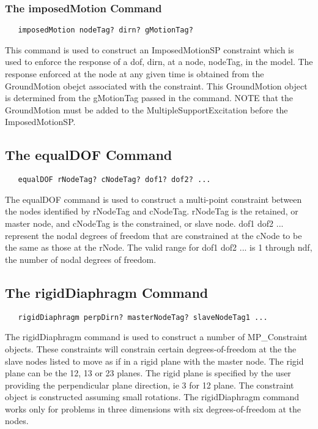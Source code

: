 \documentclass[12pt]{article}
\begin{document}
\subsubsection{The imposedMotion Command}
{\sf\small
\begin{verbatim}
   imposedMotion nodeTag? dirn? gMotionTag? 
\end{verbatim}
}

This command is used to construct an ImposedMotionSP constraint which
is used to enforce the response of a dof, dirn, at a node, nodeTag, in
the model. The response enforced at the node at any given time is
obtained from the GroundMotion obejct associated with the
constraint. This GroundMotion object is determined from the gMotionTag
passed in the command. NOTE that the GroundMotion must be added to the
MultipleSupportExcitation before the ImposedMotionSP. 


\subsection{The equalDOF Command}
{\sf\small
\begin{verbatim}
   equalDOF rNodeTag? cNodeTag? dof1? dof2? ...
\end{verbatim}
}

The equalDOF command is used to construct a multi-point constraint between
the nodes identified by rNodeTag and cNodeTag. rNodeTag is the retained, or
master node, and cNodeTag is the constrained, or slave node. dof1 dof2 ... 
represent the nodal degrees of freedom that are constrained at the cNode to
be the same as those at the rNode. The valid range for dof1 dof2 ... is 1
through ndf, the number of nodal degrees of freedom.

\subsection{The rigidDiaphragm Command}
{\sf\small
\begin{verbatim}
   rigidDiaphragm perpDirn? masterNodeTag? slaveNodeTag1 ...
\end{verbatim}
}

The rigidDiaphragm command is used to construct a number of
MP\_Constraint objects. These constraints will constrain certain
degrees-of-freedom at the the slave nodes listed to move as if in a
rigid plane with the master node. The rigid plane can be the 12, 13 or
23 planes. The rigid plane is specified by the user providing the
perpendicular plane direction, ie 3 for 12 plane. The constraint
object is constructed assuming small rotations. The rigidDiaphragm
command works only for problems in three dimensions with six
degrees-of-freedom at the nodes. 
\end{document}
